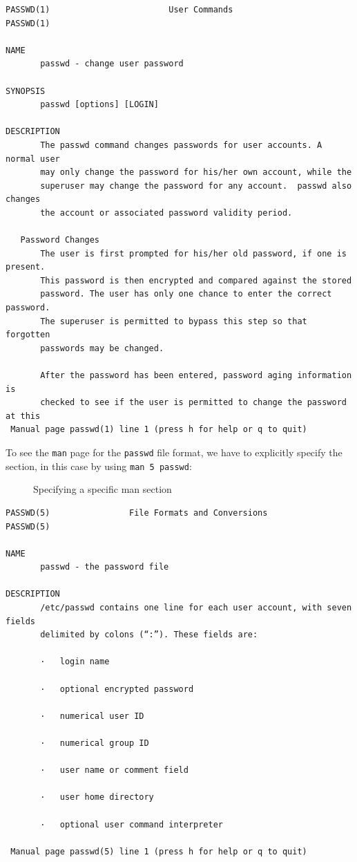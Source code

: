 \documentclass[10pt,]{book}
\numberwithin{figure}{chapter}
\DeclareRobustCommand{\drcap}[1]{\begin{figure}[H]\caption{#1}\end{figure}}
\begin{document}
\begin{verbatim}
PASSWD(1)                        User Commands                       PASSWD(1)

NAME
       passwd - change user password

SYNOPSIS
       passwd [options] [LOGIN]

DESCRIPTION
       The passwd command changes passwords for user accounts. A normal user
       may only change the password for his/her own account, while the
       superuser may change the password for any account.  passwd also changes
       the account or associated password validity period.

   Password Changes
       The user is first prompted for his/her old password, if one is present.
       This password is then encrypted and compared against the stored
       password. The user has only one chance to enter the correct password.
       The superuser is permitted to bypass this step so that forgotten
       passwords may be changed.

       After the password has been entered, password aging information is
       checked to see if the user is permitted to change the password at this
 Manual page passwd(1) line 1 (press h for help or q to quit)
\end{verbatim}

To see the \texttt{man} page for the \texttt{passwd} file format, we
have to explicitly specify the section, in this case by using
\texttt{man 5 passwd}:

\drcap{Specifying a specific man section}

\begin{verbatim}
PASSWD(5)                File Formats and Conversions                PASSWD(5)

NAME
       passwd - the password file

DESCRIPTION
       /etc/passwd contains one line for each user account, with seven fields
       delimited by colons (“:”). These fields are:

       ·   login name

       ·   optional encrypted password

       ·   numerical user ID

       ·   numerical group ID

       ·   user name or comment field

       ·   user home directory

       ·   optional user command interpreter

 Manual page passwd(5) line 1 (press h for help or q to quit)
\end{verbatim}
\end{document}
